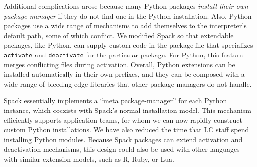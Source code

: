 Additional complications arose because many Python packages 
{\it install their own package manager} if they do not find one in the 
Python installation. Also, Python packages use a wide range of mechanisms
to add themselves to the interpreter's default path, some of which conflict. 
We modified Spack so that extendable packages, like Python, can supply 
custom code in the package file that specializes {\tt activate} and 
{\tt deactivate} for the particular package. For Python, this feature 
merges conflicting files during activation. Overall, Python extensions can
be installed automatically in their own prefixes, and they can be composed
with a wide range of bleeding-edge libraries that other package managers do
not handle.


Spack essentially implements a ``meta package-manager'' for each Python
instance, which coexists with Spack's normal installation model.
This mechanism efficiently supports application teams, for whom we can
now rapidly construct custom Python installations.  We have also reduced
the time that LC staff spend installing Python modules.
Because Spack packages can extend activation and deactivation mechanisms,
this design could also be used with other languages
with similar extension models, such as R, Ruby, or Lua.
